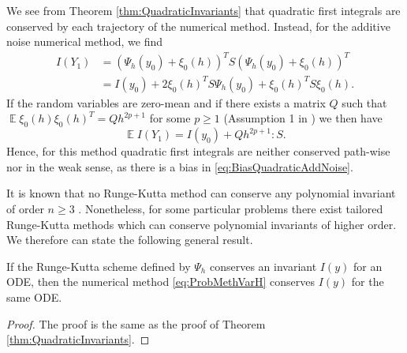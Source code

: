 \documentclass{siamart1116}
\numberwithin{theorem}{section}
\newcommand{\E}{\operatorname{\mathbb{E}}}
\begin{document}
\begin{remark}\label{rem:QuadraticInvariants} We see from Theorem \ref{thm:QuadraticInvariants} that quadratic first integrals are conserved by each trajectory of the numerical method. Instead, for the additive noise numerical method, we find
	\begin{equation}
	\begin{aligned}
		I(Y_1) &= (\Psi_h(y_0) + \xi_0(h))^T S (\Psi_h(y_0) + \xi_0(h))^T \\
		&= I(y_0) + 2\xi_0(h)^T S  \Psi_h(y_0) + \xi_0(h)^T S \xi_0(h).
	\end{aligned}
	\end{equation}
	If the random variables are zero-mean and if there exists a matrix $Q$ such that $\E\xi_0(h)\xi_0(h)^T = Qh^{2p + 1}$ for some $p \geq 1$ (Assumption 1 in \cite{CGS16}) we then have
	\begin{equation}\label{eq:BiasQuadraticAddNoise}
		\E I(Y_1) = I(y_0) + Q h^{2p + 1} : S.
	\end{equation}
	Hence, for this method quadratic first integrals are neither conserved path-wise nor in the weak sense, as there is a bias in \eqref{eq:BiasQuadraticAddNoise}.
\end{remark}
It is known that no Runge-Kutta method can conserve any polynomial invariant of order $n \geq 3$ \cite{HLW06}. Nonetheless, for some particular problems there exist tailored Runge-Kutta methods which can conserve polynomial invariants of higher order. We therefore can state the following general result.
\begin{theorem}\label{thm:PolyInvariants} If the Runge-Kutta scheme defined by $\Psi_h$ conserves an invariant $I(y)$ for an ODE, then the numerical method \eqref{eq:ProbMethVarH} conserves $I(y)$ for the same ODE.
\end{theorem}
\begin{proof} The proof is the same as the proof of Theorem \ref{thm:QuadraticInvariants}.
\end{proof}
\end{document}
